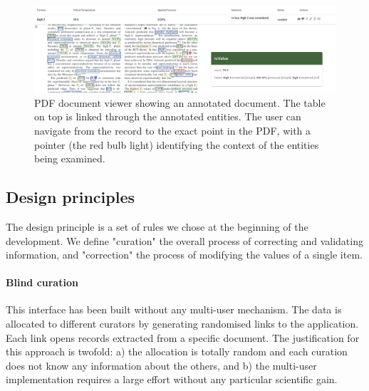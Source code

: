 \documentclass[a4paper]{article}
\begin{document}
\begin{figure}[ht]
  \centering
  \includegraphics[width=1\textwidth]{images/pdf-view-context.png} 
  \caption{PDF document viewer showing an annotated document. The table on top is linked through the annotated entities. The user can navigate from the record to the exact point in the PDF, with a pointer (the red bulb light) identifying the context of the entities being examined. }
  \label{fig:pdf-view}
\end{figure}


\subsection{Design principles}
\label{subsec:design-principles}

The design principle is a set of rules we chose at the beginning of the development. We define "curation" the overall process of correcting and validating information, and "correction" the process of modifying the values of a single item. 

\paragraph{Blind curation}
This interface has been built without any multi-user mechanism. 
The data is allocated to different curators by generating randomised links to the application. Each link opens records extracted from a specific document. 
The justification for this approach is twofold: a) the allocation is totally random and each curation does not know any information about the others, and b) the multi-user implementation requires a large effort without any particular scientific gain. 
\end{document}
